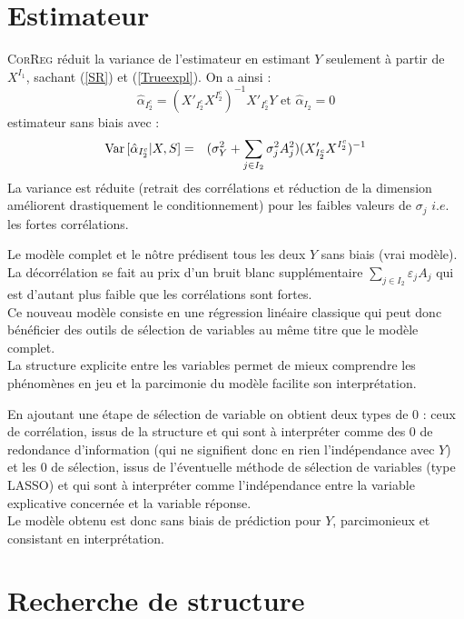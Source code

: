 \documentclass[12pt]{article}
\begin{document}
\section{Estimateur}
		\textsc{CorReg} réduit la variance de l'estimateur en estimant $Y$ seulement à partir de $X^{I_1}$, sachant (\ref{SR}) et (\ref{Trueexpl}).
			On a ainsi : 
		\begin{equation}
			\hat{\alpha}_{I_2^c} = (X'_{I_2^c} X^{I_2^c})^{-1}X'_{I_2^c}Y \textrm{ et } \hat{\alpha}_{I_2} = 0
		\end{equation}
		estimateur sans biais \cite{saporta2006probabilites} avec :
		\begin{eqnarray}
			{\rm Var}\,[\hat{\alpha}_{I_2^c}|X,S]&=& (\sigma^2_Y+\sum_{j \in I_2}\sigma^2_{j}A_{j}^2 )(X'_{I_2^c} X^{I_2^c})^{-1} \\
		\end{eqnarray}
		La variance est réduite (retrait des corrélations et réduction de la dimension améliorent drastiquement le conditionnement) pour les faibles valeurs de $\sigma_j$ $i.e.$ les fortes corrélations.					
		
		Le modèle complet et le nôtre prédisent tous les deux $Y$ sans biais (vrai modèle). La décorrélation se fait au prix d'un bruit blanc supplémentaire $\sum_{j \in I_2}\varepsilon_{j}A_{j} $ qui est d'autant plus faible que les corrélations sont fortes.
	\\	
	Ce nouveau modèle consiste en une régression linéaire classique qui peut donc bénéficier des outils de sélection de variables au même titre que le modèle complet.			
		 \\		
		 La structure explicite entre les variables permet de mieux comprendre les phénomènes en jeu et la parcimonie du modèle facilite son interprétation.		

		En ajoutant une étape de sélection de variable on obtient deux types de $0$ : ceux de corrélation, issus de la structure et qui sont à interpréter comme des $0$ de redondance d'information (qui ne signifient donc en rien l'indépendance avec $Y$) et les $0$ de sélection, issus de l'éventuelle méthode de sélection de variables (type LASSO) et qui sont à interpréter comme l'indépendance entre la variable explicative concernée et la variable réponse.
			\\
		Le modèle obtenu est donc sans biais de prédiction pour $Y$, parcimonieux et consistant en interprétation.	
		
\section{Recherche de structure}
	 	
\end{document}

